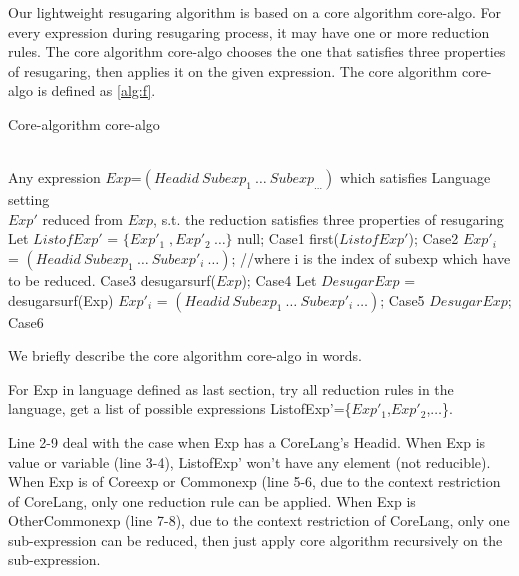 Our lightweight resugaring algorithm is based on a core algorithm core-algo. For every expression during resugaring process, it may have one or more reduction rules. The core algorithm core-algo chooses the one that satisfies three properties of resugaring, then applies it on the given expression. The core algorithm core-algo is defined as \ref{alg:f}.
\begin{algorithm}
	\caption{Core-algorithm core-algo}
	\label{alg:f}     %
	\begin{algorithmic}[1]       %
		\REQUIRE ~~\\      %
		Any expression $Exp$=$(Headid~Subexp_{1}~\ldots~Subexp_{\ldots})$ which satisfies Language setting
		\ENSURE ~~\\     %
		$Exp'$ reduced from $Exp$, s.t. the reduction satisfies three properties of resugaring
		\STATE     Let $ListofExp'$ = $\{Exp'_{1}\;,Exp'_{2}~\ldots\}$
		\RETURN null; \hfill Case1
		\RETURN first($ListofExp'$); \hfill Case2
		\ELSE 
		\RETURN $Exp'_{i}$ = $(Headid~Subexp_{1}~\ldots~Subexp'_{i}~\ldots)$; //where i is the index of subexp which have to be reduced. \hfill Case3
		\ENDIF
		\ELSE 
		\RETURN desugarsurf($Exp$); \hfill Case4
		\ELSE
		\STATE Let $DesugarExp$ = desugarsurf(Exp)
		\RETURN $Exp'_{i}$ = $(Headid~Subexp_{1}~\ldots~Subexp'_{i}~\ldots)$; \hfill Case5
		\ELSE
		\RETURN $DesugarExp$; \hfill Case6
		\ENDIF
		\ENDIF
		\ENDIF
		
	\end{algorithmic}
\end{algorithm}

We briefly describe the core algorithm core-algo in words.

For Exp in language defined as last section, try all reduction rules in the language, get a list of possible expressions ListofExp'=\{$Exp'_{1}$,$Exp'_{2}$,$\ldots$\}. 

Line 2-9 deal with the case when Exp has a CoreLang's Headid. When Exp is value or variable (line 3-4), ListofExp' won't have any element (not reducible). When Exp is of Coreexp or Commonexp (line 5-6, due to the context restriction of CoreLang, only one reduction rule can be applied. When Exp is OtherCommonexp (line 7-8), due to the context restriction of CoreLang, only one sub-expression can be reduced, then just apply core algorithm recursively on the sub-expression.

